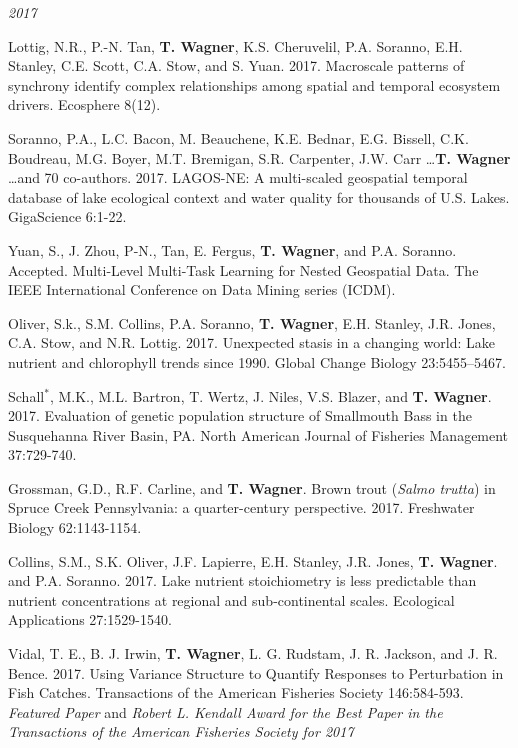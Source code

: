 \documentclass[10pt]{article}
\begin{document}
\begin{flushleft}
\begin{etaremune}[start=81]
\end{etaremune}
\emph{2017}
\begin{etaremune}[start=68]

\item Lottig, N.R., P.-N. Tan, {\bf T. Wagner}, K.S. Cheruvelil, P.A. Soranno, E.H. Stanley, C.E. Scott, C.A. Stow, and S. Yuan. 2017. Macroscale patterns of synchrony identify complex relationships among spatial and temporal ecosystem drivers. Ecosphere 8(12).

\item Soranno, P.A., L.C. Bacon, M. Beauchene, K.E. Bednar, E.G. Bissell, C.K. Boudreau, M.G. Boyer, M.T. Bremigan, S.R. Carpenter, J.W. Carr \ldots  {\bf T. Wagner} \ldots  and 70 co-authors. 2017. LAGOS-NE: A multi-scaled geospatial temporal database of lake ecological context and water quality for thousands of U.S. Lakes. GigaScience 6:1-22.

\item Yuan, S., J. Zhou, P-N., Tan, E. Fergus, {\bf T. Wagner}, and P.A. Soranno. Accepted. Multi-Level Multi-Task Learning for Nested Geospatial Data. The IEEE International Conference on Data Mining series (ICDM).

\item Oliver, S.k., S.M. Collins, P.A. Soranno, {\bf T. Wagner}, E.H. Stanley, J.R. Jones, C.A. Stow, and N.R. Lottig. 2017. Unexpected stasis in a changing world: Lake nutrient and chlorophyll trends since 1990. Global Change Biology 23:5455–5467.

\item Schall$^*$, M.K., M.L. Bartron, T. Wertz, J. Niles, V.S. Blazer, and {\bf T. Wagner}. 2017. Evaluation of genetic population structure of Smallmouth Bass in the Susquehanna River Basin, PA. North American Journal of Fisheries Management 37:729-740.

\item Grossman, G.D., R.F. Carline, and {\bf T. Wagner}. Brown trout (\emph{Salmo trutta}) in Spruce Creek Pennsylvania: a quarter-century perspective. 2017. Freshwater Biology 62:1143-1154.

\item Collins, S.M., S.K. Oliver, J.F. Lapierre, E.H. Stanley, J.R. Jones, {\bf T. Wagner}. and P.A. Soranno. 2017. Lake nutrient stoichiometry is less predictable than nutrient concentrations at regional and sub-continental scales. Ecological Applications 27:1529-1540.

\item Vidal, T. E., B. J. Irwin, {\bf T. Wagner}, L. G. Rudstam, J. R. Jackson, and J. R. Bence. 2017. Using Variance Structure to Quantify Responses to Perturbation in Fish Catches. Transactions of the American Fisheries Society 146:584-593. \emph{Featured Paper} and \emph{Robert L. Kendall Award for the Best Paper in the Transactions of the American Fisheries Society for 2017}


\end{etaremune}
\end{flushleft}
\end{document}
